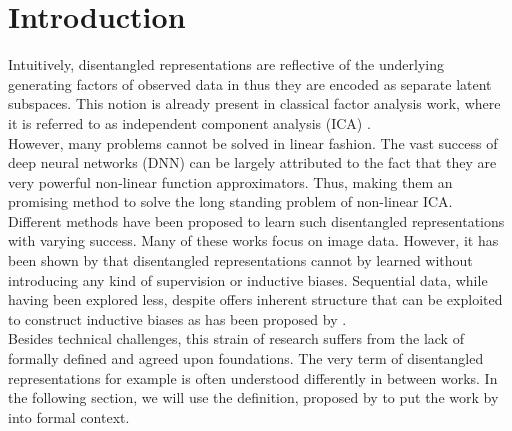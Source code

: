 \documentclass{article} %
\begin{document}
\section*{Introduction}
Intuitively, disentangled representations are reflective of the underlying generating factors of observed data in thus they are encoded as separate latent subspaces. This notion is already present in classical factor analysis work, where it is referred to as independent component analysis (ICA) \cite{comon1992independent}.\\
However, many problems cannot be solved in linear fashion. The vast success of deep neural networks (DNN) can be largely attributed to the fact that they are very powerful non-linear function approximators. Thus, making them an promising method to solve the long standing problem of non-linear ICA.\\
Different methods have been proposed to learn such disentangled representations \cite{higgins2016beta, chen2016infogan, kulkarni2015deep} with varying success. Many of these works focus on image data. However, it has been shown by \citet{locatello2019challenging} that disentangled representations cannot by learned without introducing any kind of supervision or inductive biases. Sequential data, while having been explored less, despite offers inherent structure that can be exploited to construct inductive biases as has been proposed by \citet{hsu2017unsupervised}.\\
Besides technical challenges, this strain of research suffers from the lack of formally defined and agreed upon foundations. The very term of disentangled representations for example is often understood differently in between works. In the following section, we will use the definition, proposed by \citet{higgins2018towards} to put the work by \citet{hsu2017unsupervised} into formal context. 





\end{document}
